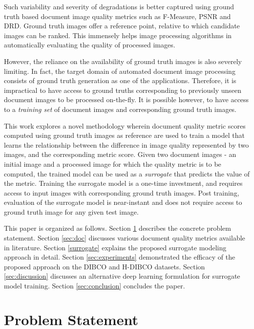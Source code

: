 \documentclass[10pt, a4paper, conference, compsocconf]{IEEEtran}
\begin{document}
Such variability and severity of degradations is better captured using ground truth based document image quality metrics such as F-Measure, PSNR and DRD. Ground truth images offer a reference point, relative to which candidate images can be ranked. This immensely helps image processing algorithms in automatically evaluating the quality of processed images.

However, the reliance on the availability of ground truth images is also severely limiting. In fact, the target domain of automated document image processing consists of ground truth generation as one of the applications. Therefore, it is impractical to have access to ground truths corresponding to previously unseen document images to be processed on-the-fly. It is possible however, to have access to a \emph{training set} of document images and corresponding ground truth images.

This work explores a novel methodology wherein document quality metric scores computed using ground truth images as reference are used to train a model that learns the relationship between the difference in image quality represented by two images, and the corresponding metric score. Given two document images - an initial image and a processed image for which the quality metric is to be computed, the trained model can be used as a \emph{surrogate} that predicts the value of the metric. Training the surrogate model is a one-time investment, and requires access to input images with corresponding ground truth images. Post training, evaluation of the surrogate model is near-instant and does not require access to ground truth image for any given test image.

This paper is organized as follows. Section \ref{sec:prob} describes the concrete problem statement. Section \ref{sec:doc} discusses various document quality metrics available in literature. Section \ref{surrogate} explains the proposed surrogate modeling approach in detail. Section \ref{sec:experiments} demonstrated the efficacy of the proposed approach on the DIBCO and H-DIBCO datasets. Section \ref{sec:discussion} discusses an alternative deep learning formulation for surrogate model training. Section \ref{sec:conclusion} concludes the paper.

\section{Problem Statement}
\label{sec:prob}
\end{document}

